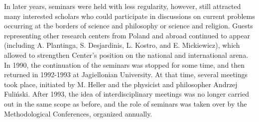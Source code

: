\documentclass[a4paper]{article}
\begin{document}
In later years, seminars were held with less regularity, however, still attracted many interested scholars who could
participate in discussions on current problems occurring at the borders of science and philosophy or science and
religion. Guests representing other research centers from Poland and abroad continued to appear (including A.
Plantinga, S. Desjardinis, L. Kostro, and E. Mickiewicz), which allowed to strengthen Center’s position on the national
and international arena. In 1990, the continuation of the seminars was stopped for some time, and then returned in
1992-1993 at Jagiellonian University. At that time, several meetings took place, initiated by M. Heller and the
physicist and philosopher Andrzej Fuliński. After 1993, the idea of interdisciplinary meetings was no longer carried
out in the same scope as before, and the role of seminars was taken over by the Methodological Conferences, organized
annually.
\end{document}
